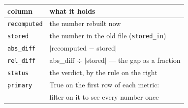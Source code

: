 \begin{frame}
\vspace{3pt}
\begin{columns}[T]
{\sffamily\scriptsize
\begin{tabular}{@{}ll@{}}
\toprule
\textbf{column} & \textbf{what it holds} \\
\midrule
\texttt{recomputed} & the number rebuilt now \\
\texttt{stored}     & the number in the old file (\texttt{stored\_in}) \\
\texttt{abs\_diff}  & $|$recomputed $-$ stored$|$ \\
\texttt{rel\_diff}  & abs\_diff $\div$ $|$stored$|$ --- the gap as a fraction \\
\texttt{status}     & the verdict, by the rule on the right \\
\texttt{primary}    & True on the first row of each metric: \\
                    & \quad filter on it to see every number once \\
\bottomrule
\end{tabular}}
\end{columns}
\end{frame}

